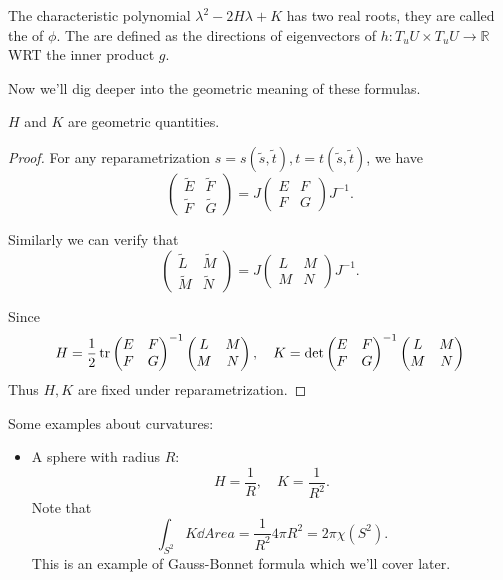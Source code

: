 \begin{definition}
	The characteristic polynomial $\lambda^2 - 2H\lambda + K$
	has two real roots, they are called the
	 of $\phi$.
	The  are defined as
	the directions of eigenvectors of $h: T_uU\times T_uU\to \mathbb{R}$
	WRT the inner product $g$.
\end{definition}

Now we'll dig deeper into the geometric meaning of these formulas.
\begin{proposition}
	$H$ and $K$ are geometric quantities.
\end{proposition}
\begin{proof}[Proof]
    For any reparametrization $s=s(\tilde s, \tilde t), t=t(\tilde s,\tilde t)$,
	we have
	\[
		\begin{pmatrix}\tilde E&\tilde F\\ \tilde F&\tilde G \end{pmatrix}
		= J\begin{pmatrix} E&F\\F&G \end{pmatrix}J^{-1}.
	\]

	Similarly we can verify that
	\[
		\begin{pmatrix}\tilde L&\tilde M\\ \tilde M&\tilde N \end{pmatrix}
		= J\begin{pmatrix} L&M\\M&N \end{pmatrix}J^{-1}.
	\]

	Since
	\[
	H = \frac{1}{2}\operatorname{tr}\begin{pmatrix} E&F\\F&G \end{pmatrix}^{-1}\begin{pmatrix} L&M\\M&N \end{pmatrix},\quad
	K = \det \begin{pmatrix} E&F\\F&G \end{pmatrix}^{-1}\begin{pmatrix} L&M\\M&N \end{pmatrix}
	\]
	Thus $H,K$ are fixed under reparametrization.
\end{proof}

\begin{example}
    Some examples about curvatures:
	\begin{itemize}
		\item A sphere with radius $R$:
			\[
			H = \frac{1}{R}, \quad K = \frac{1}{R^2}.
			\]
			Note that
			\[
			\int _{S^2} K \dd Area = \frac{1}{R^2}4\pi R^2 = 2\pi \chi(S^2).
			\]
			This is an example of Gauss-Bonnet formula which we'll cover later.
	\end{itemize}
\end{example}
